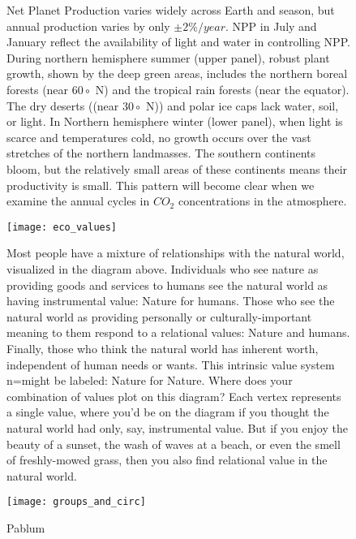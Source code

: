 \newpage
\begin{figure}[p]
\centering
{}


\caption{Net Planet Production varies widely across Earth and season, but annual production varies by only $\pm 2\%/year$. NPP in July and January reflect the availability of light and water in controlling NPP. During northern hemisphere summer (upper panel), robust plant growth, shown by the deep green areas, includes the northern boreal forests (near $60\circ$ N) and the tropical rain forests (near the equator). The dry deserts ((near $30\circ$ N)) and polar ice caps lack water, soil, or light. In Northern hemisphere winter (lower panel), when light is scarce and temperatures cold, no growth occurs over the vast stretches of the northern landmasses. The southern continents bloom, but the relatively small areas of these continents means their productivity is small. This pattern will become clear when we examine the annual cycles in $CO_2$ concentrations in the atmosphere.  }

\label{fig:npp}
\end{figure}

\newpage
\begin{figure}[p]
\centering
  \texttt{[image: eco\_values]}%


\caption{Most people have a mixture of relationships with the natural world, visualized in the diagram above. Individuals who see nature as providing goods and services to humans see the natural world as having instrumental value: Nature for humans. Those who see the natural world as providing personally or culturally-important meaning to them respond to a relational values: Nature and humans. Finally, those who think the natural world has inherent worth, independent of human needs or wants. This intrinsic value system n=might be labeled: Nature for Nature. Where does your combination of values plot on this diagram? Each vertex represents a single value, where you'd be on the diagram if you thought the natural world had only, say, instrumental value. But if you enjoy the beauty of a sunset, the wash of waves at a beach, or even the smell of freshly-mowed grass, then you also find relational value in the natural world. }
\label{fig:eco_values}
\end{figure}



\newpage
\begin{figure}[p]
\centering
  \texttt{[image: groups\_and\_circ]}%

\caption{Pablum}
\label{fig:groups_and_circ}
\end{figure}



